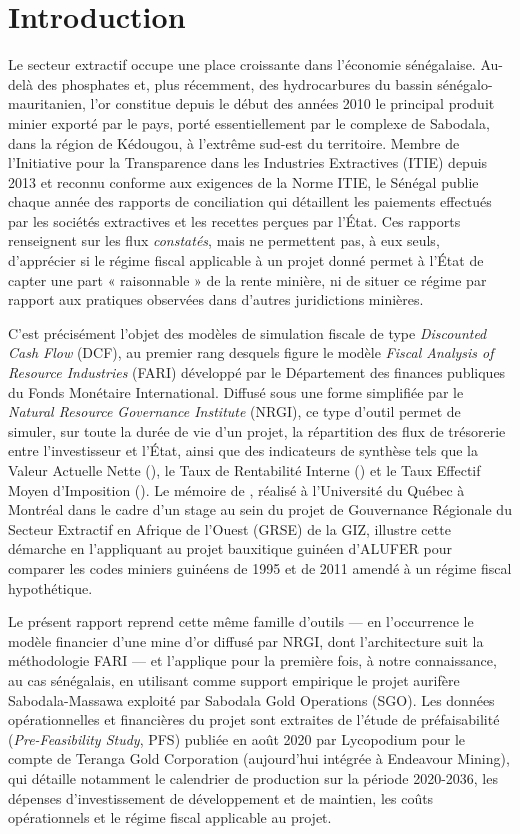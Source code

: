 \chapter*{Introduction}

Le secteur extractif occupe une place croissante dans l'économie sénégalaise. Au-delà des phosphates et, plus récemment, des hydrocarbures du bassin sénégalo-mauritanien, l'or constitue depuis le début des années 2010 le principal produit minier exporté par le pays, porté essentiellement par le complexe de Sabodala, dans la région de Kédougou, à l'extrême sud-est du territoire. Membre de l'Initiative pour la Transparence dans les Industries Extractives (ITIE) depuis 2013 et reconnu conforme aux exigences de la Norme ITIE, le Sénégal publie chaque année des rapports de conciliation qui détaillent les paiements effectués par les sociétés extractives et les recettes perçues par l'État. Ces rapports renseignent sur les flux \emph{constatés}, mais ne permettent pas, à eux seuls, d'apprécier si le régime fiscal applicable à un projet donné permet à l'État de capter une part « raisonnable » de la rente minière, ni de situer ce régime par rapport aux pratiques observées dans d'autres juridictions minières.

C'est précisément l'objet des modèles de simulation fiscale de type \emph{Discounted Cash Flow} (DCF), au premier rang desquels figure le modèle \emph{Fiscal Analysis of Resource Industries} (FARI) développé par le Département des finances publiques du Fonds Monétaire International. Diffusé sous une forme simplifiée par le \emph{Natural Resource Governance Institute} (NRGI), ce type d'outil permet de simuler, sur toute la durée de vie d'un projet, la répartition des flux de trésorerie entre l'investisseur et l'État, ainsi que des indicateurs de synthèse tels que la Valeur Actuelle Nette (\VAN), le Taux de Rentabilité Interne (\TRI) et le Taux Effectif Moyen d'Imposition (\TEMI). Le mémoire de \citet{kourouma2019}, réalisé à l'Université du Québec à Montréal dans le cadre d'un stage au sein du projet de Gouvernance Régionale du Secteur Extractif en Afrique de l'Ouest (GRSE) de la GIZ, illustre cette démarche en l'appliquant au projet bauxitique guinéen d'ALUFER pour comparer les codes miniers guinéens de 1995 et de 2011 amendé à un régime fiscal hypothétique.

Le présent rapport reprend cette même famille d'outils --- en l'occurrence le modèle financier d'une mine d'or diffusé par NRGI, dont l'architecture suit la méthodologie FARI --- et l'applique pour la première fois, à notre connaissance, au cas sénégalais, en utilisant comme support empirique le projet aurifère Sabodala-Massawa exploité par Sabodala Gold Operations (SGO). Les données opérationnelles et financières du projet sont extraites de l'étude de préfaisabilité (\emph{Pre-Feasibility Study}, PFS) publiée en août 2020 par Lycopodium pour le compte de Teranga Gold Corporation (aujourd'hui intégrée à Endeavour Mining), qui détaille notamment le calendrier de production sur la période 2020-2036, les dépenses d'investissement de développement et de maintien, les coûts opérationnels et le régime fiscal applicable au projet.

